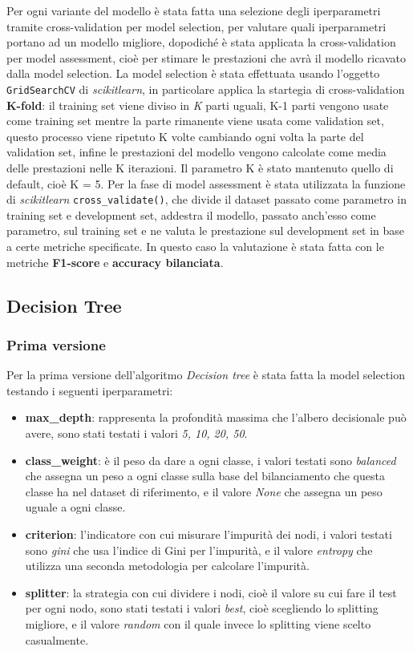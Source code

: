 Per ogni variante del modello è stata fatta una selezione degli iperparametri tramite cross-validation per model selection, per valutare quali iperparametri portano ad un modello migliore, dopodiché è stata applicata la cross-validation per model assessment, cioè per stimare le prestazioni che avrà il modello ricavato dalla model selection. La model selection è stata effettuata usando l'oggetto \verb+GridSearchCV+ di \textit{scikitlearn}, in particolare applica la startegia di cross-validation \textbf{K-fold}: il training set viene diviso in \textit{K} parti uguali, K-1 parti vengono usate come training set mentre la parte rimanente viene usata come validation set, questo processo viene ripetuto K volte cambiando ogni volta la parte del validation set, infine le prestazioni del modello vengono calcolate come media delle prestazioni nelle K iterazioni. Il parametro K è stato mantenuto quello di default, cioè K = 5. Per la fase di model assessment è stata utilizzata la funzione di \textit{scikitlearn} \verb+cross_validate()+, che divide il dataset passato come parametro in training set e development set, addestra il modello, passato anch'esso come parametro, sul training set e ne valuta le prestazione sul development set in base a certe metriche specificate. In questo caso la valutazione è stata fatta con le metriche \textbf{F1-score} e \textbf{accuracy bilanciata}.

\subsection{Decision Tree}
\subsubsection{Prima versione}\label{subsubsec:dtv1}
Per la prima versione dell'algoritmo \textit{Decision tree} è stata fatta la model selection testando i seguenti iperparametri:
\begin{itemize}
\item \textbf{max\_depth}: rappresenta la profondità massima che l'albero decisionale può avere, sono stati testati i valori \textit{5, 10, 20, 50}.
\item \textbf{class\_weight}: è il peso da dare a ogni classe, i valori testati sono \textit{balanced} che assegna un peso a ogni classe sulla base del bilanciamento che questa classe ha nel dataset di riferimento, e il valore \textit{None} che assegna un peso uguale a ogni classe.
\item \textbf{criterion}: l'indicatore con cui misurare l'impurità dei nodi, i valori testati sono \textit{gini} che usa l'indice di Gini per l'impurità, e il valore \textit{entropy} che utilizza una seconda metodologia per calcolare l'impurità.
\item \textbf{splitter}: la strategia con cui dividere i nodi, cioè il valore su cui fare il test per ogni nodo, sono stati testati i valori \textit{best}, cioè scegliendo lo splitting migliore, e il valore \textit{random} con il quale invece lo splitting viene scelto casualmente.
\end{itemize}

